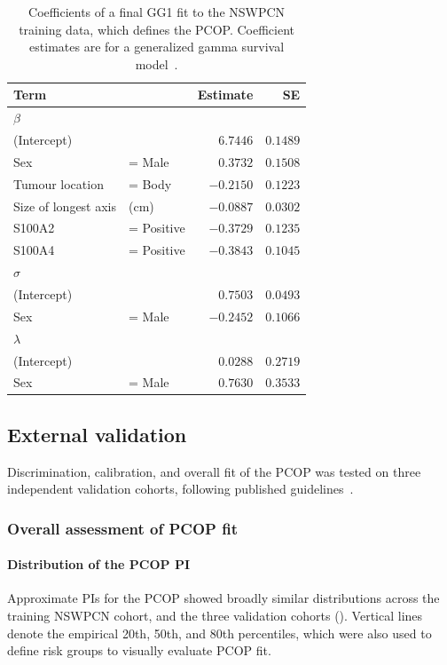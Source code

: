 \documentclass[dissertation.tex]{subfiles}
\begin{document}
\begin{table}
\centering
\caption[Final PCOP fit]{Coefficients of a final GG1 fit to the \gls{NSWPCN} training data, which defines the \gls{PCOP}.  Coefficient estimates are for a generalized gamma survival model~\cite{Cox2007}.}\label{tab:nomo-final-fit}
\begin{tabular}{llrr}
\toprule
Term                   &                & Estimate       & SE       \\ \midrule
$\beta$ \\
(Intercept)            &                &  $6.7446$      & $0.1489$ \\
Sex                    & = Male         &  $0.3732$      & $0.1508$ \\
Tumour location        & = Body         & $-0.2150$      & $0.1223$ \\
Size of longest axis   &  (cm)          & $-0.0887$      & $0.0302$ \\
S100A2                 & = Positive     & $-0.3729$      & $0.1235$ \\
S100A4                 & = Positive     & $-0.3843$      & $0.1045$ \\[10pt]
$\sigma$ \\
(Intercept)            &                &  $0.7503$      & $0.0493$ \\
Sex                    & = Male         & $-0.2452$      & $0.1066$ \\[10pt]
$\lambda$ \\
(Intercept)            &                &  $0.0288$      & $0.2719$ \\
Sex                    & = Male         &  $0.7630$      & $0.3533$ \\[5pt] \bottomrule
\end{tabular}
\end{table}


\subsection{External validation}
Discrimination, calibration, and overall fit of the \gls{PCOP} was tested on three independent validation cohorts, following published guidelines~\cite{Royston2013}.

\subsubsection{Overall assessment of \texorpdfstring{\acrshort{PCOP}}{PCOP} fit}
\paragraph{Distribution of the \texorpdfstring{\acrshort{PCOP}}{PCOP} \texorpdfstring{\acrshort{PI}}{PI}}
Approximate \glspl{PI} for the \gls{PCOP} showed broadly similar distributions across the training \gls{NSWPCN} cohort, and the three validation cohorts ().  Vertical lines denote the empirical 20th, 50th, and 80th percentiles, which were also used to define risk groups to visually evaluate \gls{PCOP} fit.
\end{document}
